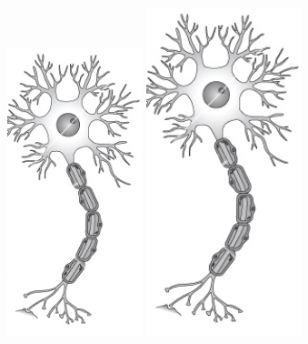 \documentclass[aspectratio=169]{beamer}
\begin{document}
\begin{frame}
\begin{figure}[ht]
        \begin{minipage}[b]{0.23\linewidth}
            \includegraphics[width=0.35\textwidth]{images/InactiveNeuron.jpg}
        \end{minipage}
        \begin{minipage}[b]{0.23\linewidth}
            \includegraphics[width=0.4\textwidth]{images/InactiveNeuron.jpg}
        \end{minipage}
        \begin{minipage}[b]{0.23\linewidth}

\end{minipage}
\end{figure}
\end{frame}
\end{document}
